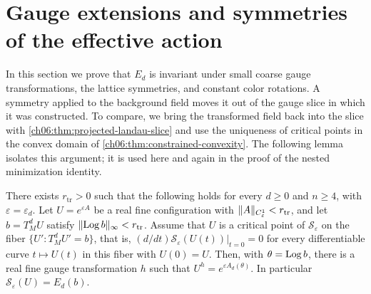 \section{Gauge extensions and symmetries of the effective action}\label{ch07:sec:symmetries}

In this section we prove that $E_d$ is invariant under small coarse gauge transformations, the lattice symmetries, and constant color rotations. A symmetry applied to the background field moves it out of the gauge slice in which it was constructed. To compare, we bring the transformed field back into the slice with \cref{ch06:thm:projected-landau-slice} and use the uniqueness of critical points in the convex domain of \cref{ch06:thm:constrained-convexity}. The following lemma isolates this argument; it is used here and again in the proof of the nested minimization identity.

\begin{lemma}\label{ch07:lem:criticality-transfer}
There exists $r_{\mathrm{tr}}>0$ such that the following holds for every $d\ge0$ and $n\ge4$, with $\varepsilon=\varepsilon_d$. Let $U=e^{\varepsilon A}$ be a real fine configuration with $\lVert A\rVert_{C^1_\varepsilon}<r_{\mathrm{tr}}$, and let $b=T_M^dU$ satisfy $\lVert \operatorname{Log} b\rVert_\infty<r_{\mathrm{tr}}$. Assume that $U$ is a critical point of $\mathscr S_\varepsilon$ on the fiber $\{U':T_M^dU'=b\}$, that is, $(d/dt)\mathscr S_\varepsilon(U(t))|_{t=0}=0$ for every differentiable curve $t\mapsto U(t)$ in this fiber with $U(0)=U$. Then, with $\theta=\operatorname{Log} b$, there is a real fine gauge transformation $h$ such that $U^h=e^{\varepsilon A_d(\theta)}$. In particular $\mathscr S_\varepsilon(U)=E_d(b)$.
\end{lemma}

